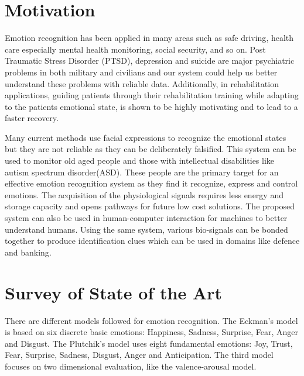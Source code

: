 \documentclass[11pt]{article}
\theoremstyle{definition}
\begin{document}
  \section{Motivation}
    Emotion recognition has been applied in many areas such as safe driving\cite{de_nadai_enhancing_2016}, health care\cite{guo_pervasive_2013} especially mental health monitoring\cite{verschuere_psychopathy_2006}, social security\cite{noauthor_facial_nodate}, and so on. 
    Post Traumatic Stress Disorder (PTSD), depression and suicide are major psychiatric problems in both military and civilians\cite{bryan_combat_2013, tarrier_suicide_2004} and our system could help us better understand these problems with reliable data.
    Additionally, in rehabilitation applications, guiding patients through their rehabilitation training while adapting to the patients emotional state, is shown to be highly motivating and to lead to a faster recovery\cite{evans_positive_2011}.

    Many current methods use facial expressions to recognize the emotional states but they are not reliable as they can be deliberately falsified\cite{cannon_james-lange_1927}.
    This system can be used to monitor old aged people and those with intellectual disabilities like autism spectrum disorder(ASD). 
    These people are the primary target for an effective emotion recognition system as they find it recognize, express and control emotions\cite{sparks_brain_2002}.
    The acquisition of the physiological signals requires less energy and storage capacity and opens pathways for future low cost solutions. 
    The proposed system can also be used in human-computer interaction for machines to better understand humans\cite{molina_emotional_2009}. 
    Using the same system, various bio-signals can be bonded together to produce identification clues which can be used in domains like defence and banking\cite{kim_biometric_2009}.

  \section{Survey of State of the Art}
    There are different models followed for emotion recognition. 
    The Eckman's model is based on six discrete basic emotions: Happiness, Sadness, Surprise, Fear, Anger and Disgust\cite{ekman_universals_1987}. 
    The Plutchik's model uses eight fundamental emotions: Joy, Trust, Fear, Surprise, Sadness, Disgust, Anger and Anticipation\cite{plutchik_nature_2001}. 
    The third model\cite{russell_evidence_1977} focuses on two dimensional evaluation, like the valence-arousal model\cite{soleymani_multimodal_2012}.
\end{document}
